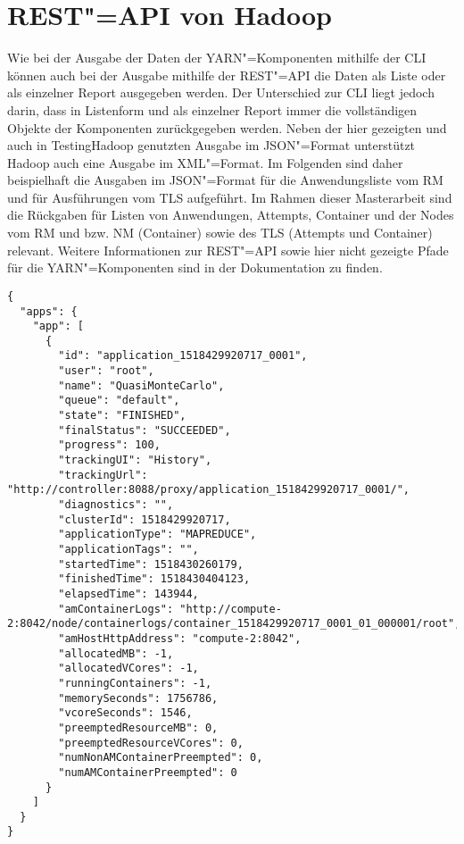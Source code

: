 \chapter{REST"=API von Hadoop}
\label{app:hadoopRestApi}

Wie bei der Ausgabe der Daten der YARN"=Komponenten mithilfe der \gls{CLI} können auch bei der Ausgabe mithilfe der REST"=API die Daten als Liste oder als einzelner Report ausgegeben werden.
Der Unterschied zur \gls{CLI} liegt jedoch darin, dass in Listenform und als einzelner Report immer die vollständigen Objekte der Komponenten zurückgegeben werden.
Neben der hier gezeigten und auch in TestingHadoop genutzten Ausgabe im JSON"=Format unterstützt Hadoop auch eine Ausgabe im XML"=Format.
Im Folgenden sind daher beispielhaft die Ausgaben im JSON"=Format für die Anwendungsliste vom \gls{RM} und für Ausführungen vom \gls{TLS} aufgeführt.
Im Rahmen dieser Masterarbeit sind die Rückgaben für Listen von Anwendungen, Attempts, Container und der Nodes vom \gls{RM} und bzw. \gls{NM} (Container) sowie des \gls{TLS} (Attempts und Container) relevant.
Weitere Informationen zur REST"=API sowie hier nicht gezeigte Pfade für die YARN"=Komponenten sind in der Dokumentation \cite{HadoopYarnTlServer271,HadoopRmApi271,HadoopNmApi271} zu finden.

\begin{lstlisting}[label=lst:hadoopAppListRestRm,style=json,
caption={[REST"=Ausgabe aller Anwendungen vom \glsentryshort{RM}]
    REST"=Ausgabe aller Anwendungen vom \acrshort{RM}.
    Die Liste kann mithilfe verschiedener Query"=Parameter gefiltert werden.\\
    URL: \url{http://addr:port/ws/v1/cluster/apps}}]
{
  "apps": {
    "app": [
      {
        "id": "application_1518429920717_0001",
        "user": "root",
        "name": "QuasiMonteCarlo",
        "queue": "default",
        "state": "FINISHED",
        "finalStatus": "SUCCEEDED",
        "progress": 100,
        "trackingUI": "History",
        "trackingUrl": "http://controller:8088/proxy/application_1518429920717_0001/",
        "diagnostics": "",
        "clusterId": 1518429920717,
        "applicationType": "MAPREDUCE",
        "applicationTags": "",
        "startedTime": 1518430260179,
        "finishedTime": 1518430404123,
        "elapsedTime": 143944,
        "amContainerLogs": "http://compute-2:8042/node/containerlogs/container_1518429920717_0001_01_000001/root",
        "amHostHttpAddress": "compute-2:8042",
        "allocatedMB": -1,
        "allocatedVCores": -1,
        "runningContainers": -1,
        "memorySeconds": 1756786,
        "vcoreSeconds": 1546,
        "preemptedResourceMB": 0,
        "preemptedResourceVCores": 0,
        "numNonAMContainerPreempted": 0,
        "numAMContainerPreempted": 0
      }
    ]
  }
}
\end{lstlisting}

